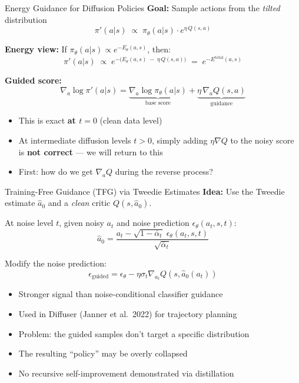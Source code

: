 \documentclass[aspectratio=169,11pt]{beamer}
\begin{document}
\begin{frame}{Energy Guidance for Diffusion Policies}
\textbf{Goal:} Sample actions from the \emph{tilted} distribution
\[
  \pi'(a|s) \;\propto\; \pi_\theta(a|s) \cdot e^{\eta\, Q(s,a)}
\]

\pause
\medskip
\textbf{Energy view:} If $\pi_\theta(a|s) \propto e^{-E_\theta(a,s)}$, then:
\[
  \pi'(a|s) \;\propto\; e^{-\big(E_\theta(a,s)\;-\;\eta\, Q(s,a)\big)}
  \;=\; e^{-E^{\mathrm{total}}(a,s)}
\]

\pause
\medskip
\textbf{Guided score:}
\[
  \nabla_a \log \pi'(a|s) = \underbrace{\nabla_a \log \pi_\theta(a|s)}_{\text{base score}} + \underbrace{\eta\, \nabla_a Q(s,a)}_{\text{guidance}}
\]

\pause
\begin{itemize}\setlength\itemsep{4pt}
  \item This is exact \textbf{at $t=0$} (clean data level)
  \item At intermediate diffusion levels $t > 0$, simply adding $\eta \nabla Q$ to the noisy score is \textbf{not correct} --- we will return to this
  \item First: how do we get $\nabla_a Q$ during the reverse process?
\end{itemize}
\end{frame}

\begin{frame}{Training-Free Guidance (TFG) via Tweedie Estimates}
\textbf{Idea:} Use the Tweedie estimate $\hat{a}_0$ and a \emph{clean} critic $Q(s, \hat{a}_0)$.

\pause
\medskip
At noise level $t$, given noisy $a_t$ and noise prediction $\epsilon_\theta(a_t, s, t)$:
\[
  \hat{a}_0 = \frac{a_t - \sqrt{1 - \bar\alpha_t}\;\epsilon_\theta(a_t,s,t)}{\sqrt{\bar\alpha_t}}
\]

\pause
Modify the noise prediction:
\[
  \epsilon_{\text{guided}} = \epsilon_\theta - \eta \sigma_t \nabla_{a_t} Q(s, \hat{a}_0(a_t))
\]

\pause
\begin{itemize}\setlength\itemsep{4pt}
  \item \textcolor{greenaccent}{Stronger signal} than noise-conditional classifier guidance
  \item Used in Diffuser (Janner et al.\ 2022) for trajectory planning
  \item \textcolor{redaccent}{Problem:} the guided samples don't target a specific distribution
  \item The resulting ``policy'' may be overly collapsed
  \item \textcolor{redaccent}{No recursive self-improvement} demonstrated via distillation
\end{itemize}
\end{frame}
\end{document}
